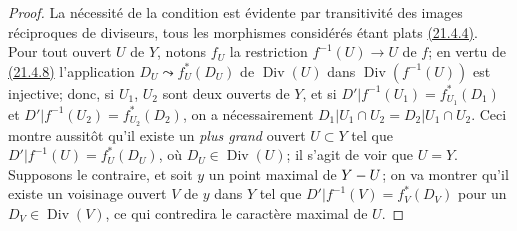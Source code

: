 \begin{proof}
La nécessité de la condition est évidente par transitivité des images
réciproques de diviseurs, tous les morphismes considérés étant plats
{\hyperlink{ega4.c04.statement.21-4-4}{(21.4.4)}}. Pour tout ouvert
$U$ de $Y$, notons $f_U$ la restriction $f^{-1}(U)\to U$ de $f$; en
vertu de {\hyperlink{ega4.c04.prop.21-4-8}{(21.4.8)}} l'application
$D_U\leadsto f_U^*(D_U)$
de $\operatorname{Div}(U)$ dans $\operatorname{Div}(f^{-1}(U))$ est
injective; donc, si $U_1$, $U_2$ sont deux ouverts de $Y$, et si
$D'|f^{-1}(U_1)=f_{U_1}^*(D_1)$ et
$D'|f^{-1}(U_2)=f_{U_2}^*(D_2)$,
on a nécessairement
$D_1|U_1\cap U_2=D_2|U_1\cap U_2$. Ceci montre aussitôt qu'il existe
un \emph{plus grand} ouvert $U\subset Y$ tel que
$D'|f^{-1}(U)=f_U^*(D_U)$, où $D_U\in\operatorname{Div}(U)$;
il s'agit de voir que $U=Y$. Supposons le contraire, et soit $y$ un
point maximal de $Y- U$; on va montrer qu'il existe un voisinage ouvert
$V$ de $y$ dans $Y$ tel que
$D'|f^{-1}(V)=f_V^*(D_V)$ pour un $D_V\in\operatorname{Div}(V)$, ce qui
contredira le caractère maximal de $U$.


\end{proof}
